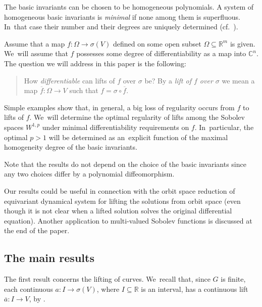 \documentclass[pdftex]{sigma}
\numberwithin{equation}{section}
\def\si{\sigma}
\def\Om{\Omega}
\def\C{\mathbb{C}}
\def\R{\mathbb{R}}
\def\ol{\overline}
\renewcommand{\o}{\circ}
\begin{document}
The basic invariants can be chosen to be homogeneous polynomials. A system of homogeneous basic invariants is \emph{minimal} if
none among them is superfluous. In~that case their number and their degrees are uniquely determined (cf.\ \cite[p.~95]{DK02}).

Assume that a map $f \colon \Om \to \si(V)$ defined on some open subset $\Om \subseteq \R^m$ is given. We~will assume that $f$ possesses some degree of differentiability as a map into $\C^n$.
The question we will address in this paper is the following:
\begin{quote}
 How \emph{differentiable} can lifts of $f$ over $\si$ be? By a \emph{lift of $f$ over $\si$} we mean a map
 $\ol f \colon \Om \to V$ such that $f = \si \o \ol f$.
\end{quote}
Simple examples show that, in general, a big loss of regularity occurs from $f$ to lifts of $f$. We~will determine the optimal regularity of lifts among the Sobolev spaces $W^{1,p}$ under minimal differentiability
requirements on $f$. In~particular, the optimal $p>1$ will be determined as an~explicit function of the maximal homogeneity degree
of the basic invariants.

Note that the results do not depend on the choice of the basic invariants since any two choices differ by a polynomial
diffeomorphism.

Our results could be useful in connection with the orbit space reduction of equivariant dyna\-mical system
for lifting the solutions from orbit space (even though it is not clear when a lifted solution solves the
original differential equation).
Another application to multi-valued Sobolev functions is discussed at the end of the paper.










\subsection{The main results}


The first result concerns the lifting of curves. We~recall that, since $G$ is finite, each continuous $a \colon I \to \si(V)$, where $I\subseteq \R$ is an interval,
has a continuous lift $\ol a \colon I \to V$, by \cite[Theorem 5.1]{LMRac}.
\end{document}
